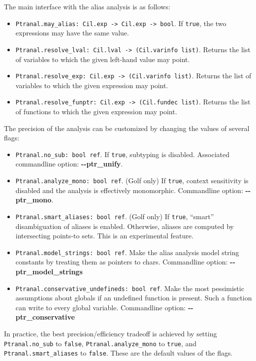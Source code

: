 \documentclass{article}
\def\t#1{{\tt #1}}
\begin{document}
The main interface with the alias analysis is as follows:
\begin{itemize}
\item \t{Ptranal.may\_alias: Cil.exp -> Cil.exp -> bool}. If
  \t{true}, the two expressions may have the same value.
\item \t{Ptranal.resolve\_lval: Cil.lval -> (Cil.varinfo
    list)}.  Returns the list of variables to which the given
  left-hand value may point.
\item \t{Ptranal.resolve\_exp: Cil.exp -> (Cil.varinfo list)}.
  Returns the list of variables to which the given expression may
  point.
\item \t{Ptranal.resolve\_funptr: Cil.exp -> (Cil.fundec
    list)}. Returns the list of functions to which the given
  expression may point.
\end{itemize}

The precision of the analysis can be customized by changing the values
of several flags:

\begin{itemize}
\item \t{Ptranal.no\_sub: bool ref}.
  If \t{true}, subtyping is disabled.  Associated commandline option:
  {\bf -{}-ptr\_unify}.
\item \t{Ptranal.analyze\_mono: bool ref}.
  (Golf only) If \t{true}, context sensitivity is disabled and the
  analysis is effectively monomorphic.  Commandline option:
  {\bf -{}-ptr\_mono}.
\item \t{Ptranal.smart\_aliases: bool ref}.
  (Golf only) If \t{true}, ``smart'' disambiguation of aliases is
  enabled.  Otherwise, aliases are computed by intersecting points-to
  sets.  This is an experimental feature.
\item \t{Ptranal.model\_strings: bool ref}.
  Make the alias analysis model string constants by treating them as
  pointers to chars.  Commandline option: {\bf -{}-ptr\_model\_strings}
\item \t{Ptranal.conservative\_undefineds: bool ref}.
  Make the most pessimistic assumptions about globals if an undefined
  function is present.  Such a function can write to every global
  variable.  Commandline option: {\bf -{}-ptr\_conservative}
\end{itemize}

In practice, the best precision/efficiency tradeoff is achieved by
setting \t{Ptranal.no\_sub} to \t{false}, \t{Ptranal.analyze\_mono} to
\t{true}, and \t{Ptranal.smart\_aliases} to \t{false}.  These are the
default values of the flags.
\end{document}
